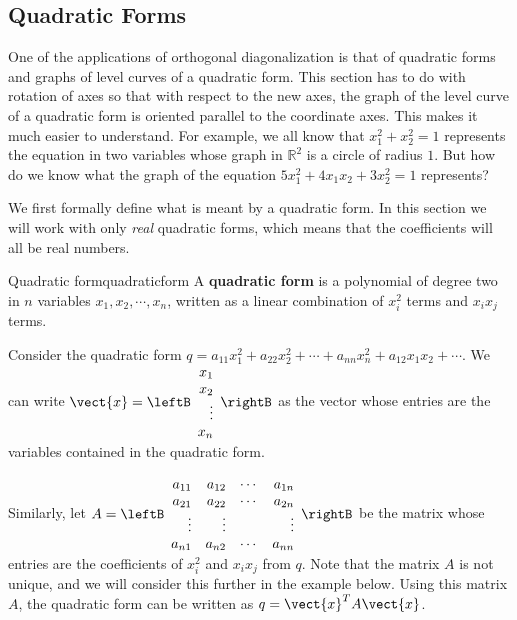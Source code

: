 \subsection{Quadratic Forms}

One of the applications of orthogonal diagonalization is that of quadratic forms and graphs of level curves of a quadratic form. This section has to do with rotation of axes
so that with respect to the new axes, the graph of the level curve of a
quadratic form is oriented parallel to the coordinate axes. This makes it
much easier to understand. For example, we all know that $x_1^2 + x_2^2=1$ represents the equation in two variables whose graph in $\mathbb{R}^2$ is a circle of radius $1$. But how do we know what the graph of the equation $5x_1^2 + 4x_1x_2 + 3x_2^2=1$ represents?  

We first formally define what is meant by a quadratic form. In this section we will work with only \textit{real} quadratic forms, which means that the coefficients will all be real numbers. 

\begin{definition}{Quadratic form}{quadraticform}
A \textbf{quadratic form} is a polynomial of degree two in $n$ variables $x_1, x_2, \cdots, x_n$, written as a linear combination of $x_i^{2}$ terms and $x_ix_j$ terms. 
\end{definition}

Consider the quadratic form $q = a_{11}x_1^2 + a_{22}x_2^2 + \cdots + a_{nn}x_n^2 + a_{12}x_1x_2 + \cdots$. We can write $\vect{x} = \leftB 
\begin{array}{r}
x_1 \\
x_2 \\
\vdots \\
x_n
\end{array} \rightB$ as the vector whose entries are the variables contained in the quadratic form.

Similarly, let $A = \leftB
\begin{array}{rrrr}
a_{11} & a_{12} & \cdots & a_{1n} \\
a_{21} & a_{22} & \cdots & a_{2n} \\
\vdots & \vdots & & \vdots \\
a_{n1} & a_{n2} & \cdots & a_{nn}
\end{array}
\rightB$ be the matrix whose entries are the coefficients of $x_i^2$ and $x_ix_j$ from $q$. Note that the matrix $A$ is not unique, and we will consider this further in the example below. Using this matrix $A$,  the quadratic form can be written as $q = \vect{x}^T A \vect{x}$. 

